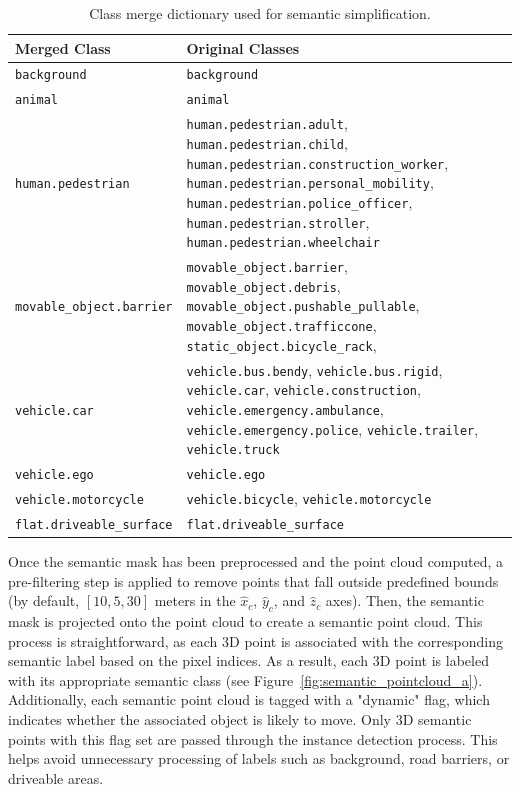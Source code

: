 \begin{table}[h!]
    \centering
    \footnotesize
    \begin{tabular}{|l|p{10cm}|}
        \hline
        \textbf{Merged Class} & \textbf{Original Classes} \\
        \hline
        \texttt{background} & \texttt{background} \\ 
        \hline
        \texttt{animal} & \texttt{animal} \\
        \hline
        \texttt{human.pedestrian} &
        \texttt{human.pedestrian.adult}, \texttt{human.pedestrian.child}, \texttt{human.pedestrian.construction\_worker}, \texttt{human.pedestrian.personal\_mobility}, \texttt{human.pedestrian.police\_officer}, \texttt{human.pedestrian.stroller}, \texttt{human.pedestrian.wheelchair} \\
        \hline
        \texttt{movable\_object.barrier} &
        \texttt{movable\_object.barrier}, \texttt{movable\_object.debris}, \texttt{movable\_object.pushable\_pullable}, \texttt{movable\_object.trafficcone}, \texttt{static\_object.bicycle\_rack}, \\
        \hline
        \texttt{vehicle.car} & 
        \texttt{vehicle.bus.bendy}, \texttt{vehicle.bus.rigid}, \texttt{vehicle.car}, \texttt{vehicle.construction}, \texttt{vehicle.emergency.ambulance}, \texttt{vehicle.emergency.police}, \texttt{vehicle.trailer}, \texttt{vehicle.truck} \\
        \hline
        \texttt{vehicle.ego} & \texttt{vehicle.ego} \\
        \hline
        \texttt{vehicle.motorcycle} & 
        \texttt{vehicle.bicycle}, \texttt{vehicle.motorcycle} \\
        \hline
        \texttt{flat.driveable\_surface} & \texttt{flat.driveable\_surface} \\
        \hline
    \end{tabular}
    \caption{Class merge dictionary used for semantic simplification.}
    \label{tab:merge_dict}
\end{table}

Once the semantic mask has been preprocessed and the point cloud computed, a pre-filtering step is applied to remove points that fall outside predefined bounds (by default, $\left[10, 5, 30\right]$ meters in the $\hat{x}_c$, $\hat{y}_c$, and $\hat{z}_c$ axes). Then, the semantic mask is projected onto the point cloud to create a semantic point cloud. This process is straightforward, as each 3D point is associated with the corresponding semantic label based on the pixel indices. As a result, each 3D point is labeled with its appropriate semantic class (see Figure~\ref{fig:semantic_pointcloud_a}). Additionally, each semantic point cloud is tagged with a "dynamic" flag, which indicates whether the associated object is likely to move. Only 3D semantic points with this flag set are passed through the instance detection process. This helps avoid unnecessary processing of labels such as background, road barriers, or driveable areas.


